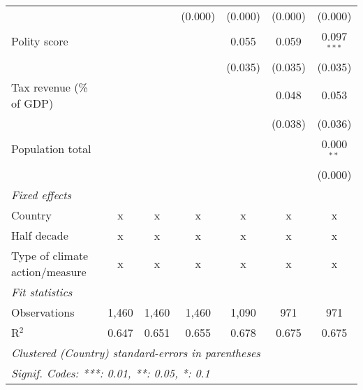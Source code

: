 \begin{tabular}{lcccccc}
                                                                                &         &                & (0.000)        & (0.000)        & (0.000)        & (0.000)\\   
   Polity score                                                                 &         &                &                & 0.055          & 0.059          & 0.097$^{***}$\\   
                                                                                &         &                &                & (0.035)        & (0.035)        & (0.035)\\   
   Tax revenue (\% of GDP)                                                      &         &                &                &                & 0.048          & 0.053\\   
                                                                                &         &                &                &                & (0.038)        & (0.036)\\   
   Population total                                                             &         &                &                &                &                & 0.000$^{**}$\\   
                                                                                &         &                &                &                &                & (0.000)\\   
   \emph{Fixed effects}\\
   Country                                                                      & x       & x              & x              & x              & x              & x\\  
   Half decade                                                                  & x       & x              & x              & x              & x              & x\\  
   Type of climate action/measure                                               & x       & x              & x              & x              & x              & x\\  
   \midrule \emph{Fit statistics}\\
   Observations                                                                 & 1,460   & 1,460          & 1,460          & 1,090          & 971            & 971\\  
   R$^2$                                                                        & 0.647   & 0.651          & 0.655          & 0.678          & 0.675          & 0.675\\  
   \midrule
   \multicolumn{7}{l}{\emph{Clustered (Country) standard-errors in parentheses}}\\
   \multicolumn{7}{l}{\emph{Signif. Codes: ***: 0.01, **: 0.05, *: 0.1}}\\
\end{tabular}
\par\endgroup


